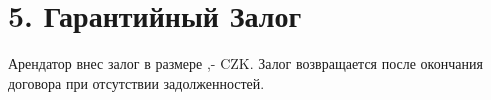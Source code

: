 \section*{5. Гарантийный Залог}
Арендатор внес залог в размере \DepositAmount,- CZK. Залог возвращается после окончания договора при отсутствии задолженностей.
